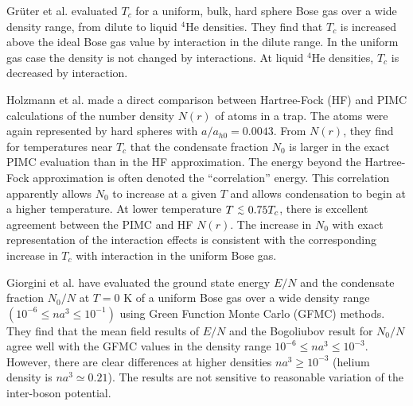 \documentclass[aps,pra,twocolumn,groupedaddress]{revtex4}
\def\lapx{\lower 2pt \hbox{$\buildrel<\over{\scriptstyle{\sim}}$\ }}
\begin{document}
Gr\"{u}ter et al.\cite{gruter97} evaluated $T_c$ for a uniform, bulk, hard
sphere Bose gas over a wide density range, from dilute to liquid $^4$He
densities. They find that $T_c$ is increased above the ideal Bose gas value by
interaction in the dilute range. In the uniform gas case the density is not changed
by interactions. At liquid $^4$He densities, $T_c$ is decreased by
interaction\cite{pollock92,wilks67}.

Holzmann et al.\cite{holzmann99} made a direct comparison between Hartree-Fock
(HF) and PIMC calculations of the number density $N(r)$ of atoms in a
trap. The atoms were again represented by hard spheres with $a/a_{h0}=0.0043$.
From $N(r)$, they find for temperatures near $T_c$ that the condensate
fraction $N_0$ is larger in the exact PIMC evaluation than in the HF
approximation. The energy beyond the Hartree-Fock approximation is often denoted
the ``correlation'' energy. This correlation apparently allows $N_0$ to
increase at a given $T$ and allows condensation to begin at a higher
temperature. At lower temperature $T\ \lapx 0.75 T_c$, there is excellent
agreement between the PIMC and HF $N(r)$. The increase in $N_0$ with exact
representation of the interaction effects is consistent with the corresponding
increase in $T_c$ with interaction in the uniform Bose gas.

Giorgini et al.\cite{giorgini} have evaluated the ground state energy $E/N$ and
the condensate fraction $N_0/N$ at $T=0$ K of a uniform Bose gas over a wide
density range $(10^{-6} \leq na^3 \leq 10^{-1})$ using Green Function Monte Carlo
(GFMC) methods. They find that the mean field results of $E/N$ and the
Bogoliubov result for $N_0/N$ agree well with the GFMC values in the density
range $10^{-6} \leq na^3 \leq 10^{-3}$. However, there are clear differences at 
higher densities $na^3 \geq 10^{-3}$ (helium density is $na^3 \simeq 0.21$). The
results are not sensitive to reasonable variation of the inter-boson
potential\cite{giorgini}.
\end{document}

